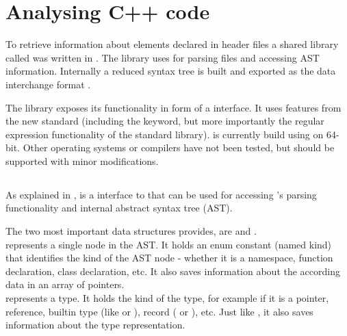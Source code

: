 \chapter{Analysing C++ code}
\label{chap:AnalysingCPP}

To retrieve information about elements declared in  header files a shared library called  was written in . The library uses  for parsing  files and accessing AST information. Internally a reduced syntax tree is built and exported as the data interchange format .

The library exposes its functionality in form of a  interface. It uses features from the new  standard  (including the  keyword, but more importantly the regular expression functionality of the standard library).  is currently build using  on  64-bit. Other operating systems or compilers have not been tested, but should be supported with minor modifications.

\section{}

As explained in ,  is a  interface to  that can be used for accessing 's parsing functionality and internal abstract syntax tree (AST).

The two most important data structures  provides, are  and .
\\ represents a single node in the AST. It holds an enum constant (named kind) that identifies the kind of the AST node - whether it is a namespace, function declaration, class declaration, etc. It also saves information about the according  data in an array of  pointers.
\\ represents a  type. It holds the kind of the type, for example if it is a pointer, reference, builtin type (like  or ), record ( or ), etc. Just like , it also saves information about the  type representation.

